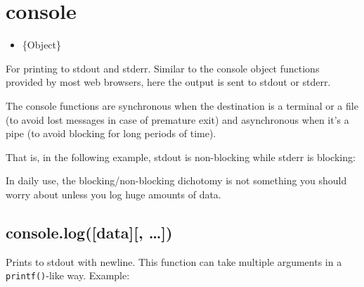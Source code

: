 \section{console}\label{console}

\begin{Shaded}
\begin{Highlighting}[]
 
\end{Highlighting}
\end{Shaded}

\begin{itemize}
\itemsep1pt\parskip0pt
\item
  \{Object\}
\end{itemize}

For printing to stdout and stderr. Similar to the console object
functions provided by most web browsers, here the output is sent to
stdout or stderr.

The console functions are synchronous when the destination is a terminal
or a file (to avoid lost messages in case of premature exit) and
asynchronous when it's a pipe (to avoid blocking for long periods of
time).

That is, in the following example, stdout is non-blocking while stderr
is blocking:

\begin{Shaded}
\begin{Highlighting}[]
 \NormalTok{> } 
\end{Highlighting}
\end{Shaded}

In daily use, the blocking/non-blocking dichotomy is not something you
should worry about unless you log huge amounts of data.

\subsection{console.log({[}data{]}{[},
\ldots{}{]})}\label{console.logdata}

Prints to stdout with newline. This function can take multiple arguments
in a \texttt{printf()}-like way. Example:

\begin{Shaded}
\end{Shaded}

